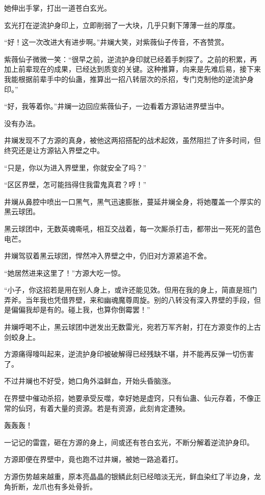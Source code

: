 \begin{this_body}
她伸出手掌，打出一道苍白玄光。

玄光打在逆流护身印上，立即削弱了一大块，几乎只剩下薄薄一丝的厚度。

“好！这一次改进大有进步啊。”井斓大笑，对紫薇仙子传音，不吝赞赏。

紫薇仙子微微一笑：“很早之前，逆流护身印就已经着手刺探了。之前的积累，再加上前辈现在的成果，已经达到质变的关键。这种推算，向来是先难后易，接下来我能根据前辈手中的仙蛊，推算出一招八转层次的杀招，专门克制他的逆流护身印。”

“好，我等着你。”井斓一边回应紫薇仙子，一边看着方源钻进界壁当中。

没有办法。

井斓发现不了方源的真身，被他这两招搭配的战术起效，虽然阻拦了许多时间，但终究还是让方源钻入界壁之中。

“只是，你以为进入界壁里，你就安全了吗？”

“区区界壁，怎可能挡得住我雷鬼真君？哼！”

井斓从鼻腔中喷出一口黑气，黑气迅速膨胀，蔓延井斓全身，将她覆盖一个厚实的黑云球团。

黑云球团中，无数英魂嘶吼，相互交战着，每一次厮杀打击，都带出一死死的蓝色电芒。

井斓驾驭着黑云球团，悍然冲入界壁之中，仍旧对方源紧追不舍。

“她居然进来这里了！”方源大吃一惊。

“小子，你这招若是用在别人身上，或许还能见效。但用在我的身上，简直是班门弄斧。当年我也凭借界壁，来和幽魂魔尊周旋。别的八转没有深入界壁的手段，但是偏偏我却是有的。碰上我，也算你倒霉罢！”

井斓呼喝不止，黑云球团中迸发出无数雷光，宛若万军齐射，打在方源变作的上古剑蛟身上。

方源痛得嚎叫起来，逆流护身印被破解得已经残缺不堪，并不能再反弹一切伤害了。

不过井斓也不好受，她口角外溢鲜血，开始头昏脑涨。

在界壁中催动杀招，她要承受反噬，幸好她是虚窍，只有仙蛊、仙元存着，不像正常的仙窍，有着大量的资源。若是有资源，此刻肯定遭殃。

轰轰轰！

一记记的雷霆，砸在方源的身上，间或还有苍白玄光，不断分解着逆流护身印。

方源即便在界壁中，竟也跑不过井斓，被她一路追着打。

方源伤势越来越重，原本亮晶晶的银鳞此刻已经暗淡无光，鲜血染红了半边身，龙角折断，龙爪也有多处骨折。


\end{this_body}
